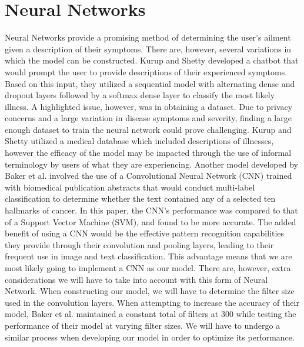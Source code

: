 \documentclass[12pt, final, onecolumn, comsoc, conference]{IEEEtran}
\begin{document}
\section{Neural Networks}
Neural Networks provide a promising method of determining the user’s ailment given a description of their symptoms. There are, however, several variations in which the model can be constructed. 
Kurup and Shetty \cite{10.1007/978-981-16-2543-5_22} developed a chatbot that would prompt the user to provide descriptions of their experienced symptoms. Based on this input, they utilized a sequential model with alternating dense and dropout layers followed by a softmax dense layer to classify the most likely illness. A highlighted issue, however, was in obtaining a dataset. Due to privacy concerns and a large variation in disease symptoms and severity, finding a large enough dataset to train the neural network could prove challenging. 
Kurup and Shetty utilized a medical database which included descriptions of illnesses, however the efficacy of the model may be impacted through the use of informal terminology by users of what they are experiencing. 
Another model developed by Baker et al. \cite{baker-etal-2016-cancer} involved the use of a Convolutional Neural Network (CNN) trained with biomedical publication abstracts that would conduct multi-label classification to determine whether the text contained any of a selected ten hallmarks of cancer. In this paper, the CNN’s performance was compared to that of a Support Vector Machine (SVM), and found to be more accurate. 
The added benefit of using a CNN would be the effective pattern recognition capabilities they provide through their convolution and pooling layers, leading to their frequent use in image and text classification. This advantage means that we are most likely going to implement a CNN as our model. 
There are, however, extra considerations we will have to take into account with this form of Neural Network. When constructing our model, we will have to determine the filter size used in the convolution layers. When attempting to increase the accuracy of their model, Baker et al. maintained a constant total of filters at 300 while testing the performance of their model at varying filter sizes. We will have to undergo a similar process when developing our model in order to optimize its performance. 
\end{document}
